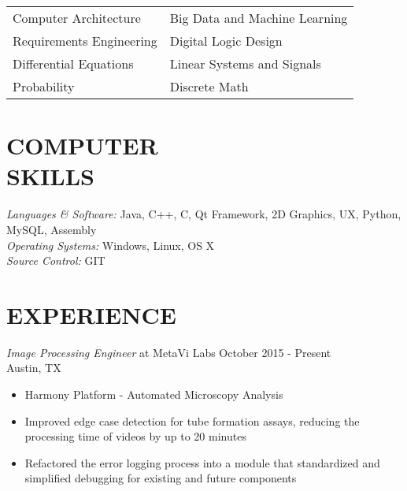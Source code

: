 \documentclass[line,margin]{res}
\begin{document}
\begin{resume}
\begin{tabularx}{\textwidth}{@{}XX@{}}
                  Computer Architecture & Big Data and Machine Learning\\

                  Requirements Engineering & Digital Logic Design \\

                  Differential Equations & Linear Systems and Signals \\

                  Probability & Discrete Math \\

                \end{tabularx}


                


                
 
\section{COMPUTER \\ SKILLS} {\sl Languages \& Software:} Java, C++, C, Qt Framework, 2D Graphics, UX, Python, MySQL, Assembly \\
        {\sl Operating Systems:} Windows, Linux, OS X \\
        {\sl Source Control:} GIT
 
        \section{EXPERIENCE} {\sl Image Processing Engineer} at MetaVi Labs \hfill October 2015 - Present \\
        Austin, TX 


        \begin{itemize}  \itemsep -2pt %
        \item         Harmony Platform - Automated Microscopy Analysis
                \item Improved edge case detection for tube formation assays, reducing the processing time of videos by up to 20 minutes
                \item Refactored the error logging process into a module that standardized and simplified debugging for existing and future components
                \end{itemize}
                

\end{resume}
\end{document}
